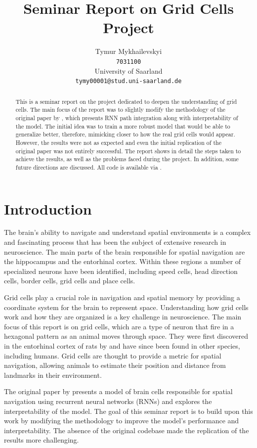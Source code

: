 \documentclass{article}
\title{Seminar Report on Grid Cells Project}
\author{Tymur Mykhailevskyi\\
  \texttt{7031100}\\
  University of Saarland\\
  \texttt{tymy00001@stud.uni-saarland.de}
  }
\begin{document}
\maketitle

\begin{abstract}
This is a seminar report on the project dedicated to deepen the understanding of grid cells. The main focus of the report was to slightly modify the methodology of the original paper by \cite{chaplot2018active}, which presents RNN path integration along with interpretability of the model. The initial idea was to train a more robust model that would be able to generalize better, therefore, mimicking closer to how the real grid cells would appear. However, the results were not as expected and even the initial replication of the original paper was not entirely successful. The report shows in detail the steps taken to achieve the results, as well as the problems faced during the project. In addition, some future directions are discussed. All code is available via \cite{sourcecode}.
\end{abstract}

\section{Introduction}

The brain's ability to navigate and understand spatial environments is a complex and fascinating process that has been the subject of extensive research in neuroscience. The main parts of the brain responsible for spatial navigation are the hippocampus and the entorhinal cortex. Within these regions a number of specialized neurons have been identified, including speed cells, head direction cells, border cells, grid cells and place cells. 

Grid cells play a crucial role in navigation and spatial memory by providing a coordinate system for the brain to represent space. Understanding how grid cells work and how they are organized is a key challenge in neuroscience. The main focus of this report is on grid cells, which are a type of neuron that fire in a hexagonal pattern as an animal moves through space. They were first discovered in the entorhinal cortex of rats by \cite{hafting2005microstructure} and have since been found in other species, including humans. Grid cells are thought to provide a metric for spatial navigation, allowing animals to estimate their position and distance from landmarks in their environment.

The original paper by \cite{chaplot2018active} presents a model of brain cells responsible for spatial navigation using recurrent neural networks (RNNs) and explores the interpretability of the model. The goal of this seminar report is to build upon this work by modifying the methodology to improve the model's performance and interpretability. The absence of the original codebase made the replication of the results more challenging.
\end{document}
